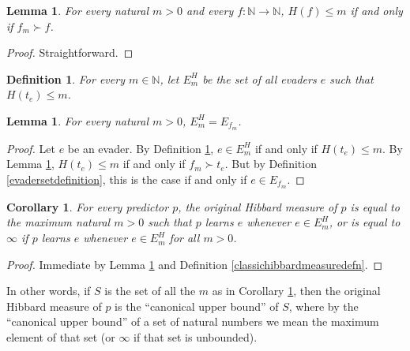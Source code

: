\documentclass{article}
\newtheorem{definition}[theorem]{Definition}
\newtheorem{corollary}[theorem]{Corollary}
\newtheorem{lemma}[theorem]{Lemma}
\begin{document}
\begin{lemma}
\label{straightfwdtechnicallemma}
    For every natural $m>0$ and every $f:\mathbb N\to\mathbb N$,
    $H(f)\leq m$ if and only if $f_m\succ f$.
\end{lemma}

\begin{proof}
    Straightforward.
\end{proof}

\begin{definition}
\label{variationondefinitionofEdefn}
    For every $m\in\mathbb N$, let $E^H_m$
    be the set of all evaders $e$ such that $H(t_e)\leq m$.
\end{definition}

\begin{lemma}
\label{equivalenceoftwoevadersetslemma}
    For every natural $m>0$, $E^H_m=E_{f_m}$.
\end{lemma}

\begin{proof}
    Let $e$ be an evader. By Definition \ref{variationondefinitionofEdefn},
    $e\in E^H_m$ if and only if $H(t_e)\leq m$.
    By Lemma \ref{straightfwdtechnicallemma}, $H(t_e)\leq m$ if and only if
    $f_m\succ t_e$. But by Definition \ref{evadersetdefinition}, this is the
    case if and only if $e\in E_{f_m}$.
\end{proof}

\begin{corollary}
\label{rephrasinghibbardsmeasurecorollary}
    For every predictor $p$, the original Hibbard measure of $p$
    is equal to the maximum natural $m>0$ such that
    $p$ learns $e$ whenever $e\in E^H_m$, or is equal to $\infty$
    if $p$ learns $e$ whenever $e\in E^H_m$ for all $m>0$.
\end{corollary}

\begin{proof}
    Immediate by Lemma \ref{equivalenceoftwoevadersetslemma}
    and Definition \ref{classichibbardmeasuredefn}.
\end{proof}

In other words, if $S$ is the set of all the $m$ as in Corollary
\ref{rephrasinghibbardsmeasurecorollary}, then the original Hibbard
measure of $p$ is the ``canonical upper bound'' of $S$, where
by the ``canonical upper bound'' of a set of natural numbers
we mean the maximum element of that set (or $\infty$ if that set
is unbounded).
\end{document}
